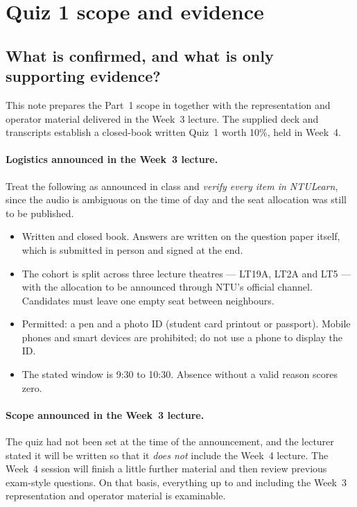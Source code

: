 \documentclass[11pt,a4paper]{article}
\begin{document}
\clearpage
\section{Quiz 1 scope and evidence}

\subsection{What is confirmed, and what is only supporting evidence?}
\begin{sloppypar}
This note prepares the Part~1 scope in
 together with
the representation and operator material delivered in the Week~3 lecture. The
supplied deck and transcripts establish a closed-book written Quiz~1 worth
10\%, held in Week~4.
\end{sloppypar}

\paragraph{Logistics announced in the Week~3 lecture.} Treat the following as
announced in class and \emph{verify every item in NTULearn}, since the audio
is ambiguous on the time of day and the seat allocation was still to be
published.
\begin{itemize}
\item Written and closed book. Answers are written on the question paper
      itself, which is submitted in person and signed at the end.
\item The cohort is split across three lecture theatres --- LT19A, LT2A and
      LT5 --- with the allocation to be announced through NTU's official
      channel. Candidates must leave one empty seat between neighbours.
\item Permitted: a pen and a photo ID (student card printout or passport).
      Mobile phones and smart devices are prohibited; do not use a phone to
      display the ID.
\item The stated window is 9:30 to 10:30. Absence without a valid reason
      scores zero.
\end{itemize}

\paragraph{Scope announced in the Week~3 lecture.} The quiz had not been set
at the time of the announcement, and the lecturer stated it will be written so
that it \emph{does not} include the Week~4 lecture. The Week~4 session will
finish a little further material and then review previous exam-style
questions. On that basis, everything up to and including the Week~3
representation and operator material is examinable.
\end{document}
